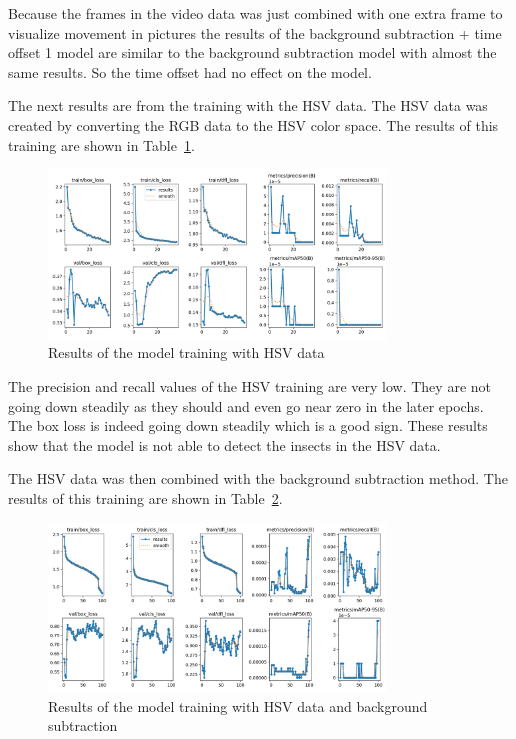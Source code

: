 Because the frames in the video data was just combined with one extra frame to visualize movement in pictures the results of the background subtraction + time offset 1 model are similar to the background subtraction model with almost the same results. So the time offset had no effect on the model.

The next results are from the training with the HSV data. The HSV data was created by converting the RGB data to the HSV color space. The results of this training are shown in Table~\ref{fig:results_hsv}.

\begin{figure}[htbp] 
    \centering
    \includegraphics[width=0.8\textwidth]{images/results/hsv_results.png}
    \caption{Results of the model training with HSV data}
    \label{fig:results_hsv}
\end{figure}

The precision and recall values of the HSV training are very low. They are not going down steadily as they should and even go near zero in the later epochs. The box loss is indeed going down steadily which is a good sign. These results show that the model is not able to detect the insects in the HSV data.

The HSV data was then combined with the background subtraction method. The results of this training are shown in Table~\ref{fig:results_hsv_bgsub}.

\begin{figure}[htbp] 
    \centering
    \includegraphics[width=0.8\textwidth]{images/results/hsv_bgsub_results.png}
    \caption{Results of the model training with HSV data and background subtraction}
    \label{fig:results_hsv_bgsub}
\end{figure}

